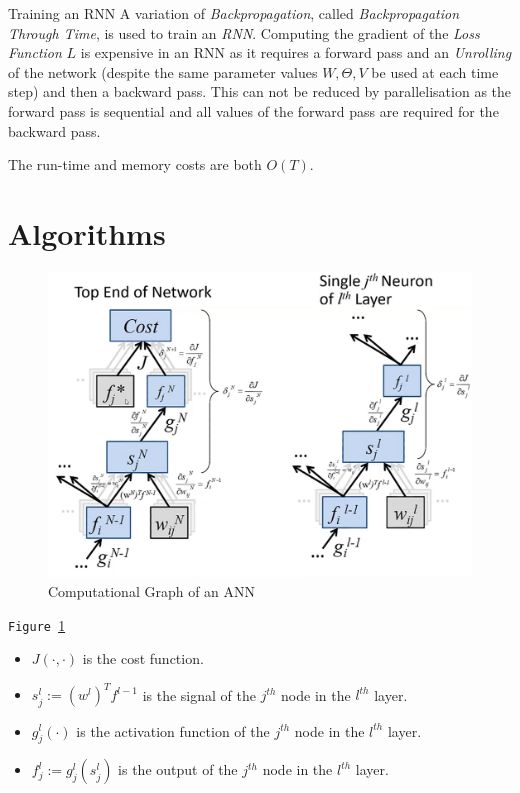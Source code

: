 \documentclass[11pt,a4paper]{article}
\begin{document}
  \begin{proposition}{Training an RNN}
    A variation of \textit{Backpropagation}, called \textit{Backpropagation Through Time}, is used to train an \textit{RNN}. Computing the gradient of the \textit{Loss Function} $L$ is expensive in an RNN as it requires a forward pass and an \textit{Unrolling} of the network (despite the same parameter values $W,\Theta,V$ be used at each time step) and then a backward pass. This can not be reduced by parallelisation as the forward pass is sequential and all values of the forward pass are required for the backward pass.
    \par The run-time and memory costs are both $O(T)$.
  \end{proposition}

\section{Algorithms} \label{sec_Algorithms}

  \begin{figure}[ht!]
    \centering
    \includegraphics[width=.5\textwidth]{NeuralNetworkComputationalGraph.PNG}
    \caption{Computational Graph of an ANN}
    \label{fig_Computational Graph}
  \end{figure}

  \begin{remark}{\texttt{Figure \ref{fig_Computational Graph}}}
    \begin{itemize}
      \item $J(\cdot,\cdot)$ is the cost function.
      \item $s_j^l:=(w^l)^Tf^{l-1}$ is the signal of the $j^{th}$ node in the $l^{th}$ layer.
      \item $g_j^l(\cdot)$ is the activation function of the $j^{th}$ node in the $l^{th}$ layer.
      \item $f_j^l:=g_j^l(s_j^l)$ is the output of the $j^{th}$ node in the $l^{th}$ layer.
    \end{itemize}
  \end{remark}
\end{document}
